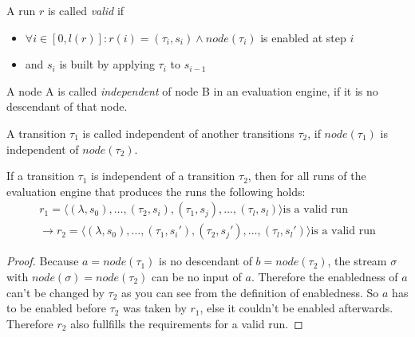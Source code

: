 \begin{definition}[name = Valid Run]\label{def:valid_run}
  A run \(r\) is called \emph{valid} if
  \begin{itemize}
    \item \(\forall i \in [0,l(r)]: r(i) = (\tau_i,s_i) \land \mathit{node}(\tau_i)\) is enabled at step \(i\)
    \item and \(s_i\) is built by applying \(\tau_i\) to \(s_{i-1}\)
  \end{itemize}
\end{definition}

\begin{definition}[name = Independence of Nodes]\label{def:node_independent}
  A node A is called \emph{independent} of node B in an evaluation engine, if it is no descendant of that node.
\end{definition}

\begin{definition}[name = Independence of Transitions]\label{def:independence_transitions}
  A transition \(\tau_1\) is called independent of another transitions \(\tau_2\), if \(\mathit{node}(\tau_1)\) is independent of \(\mathit{node}(\tau_2)\).
\end{definition}

\begin{lemma}[name = Exchange of Independent Transitions]\label{lemma:exchange_independent_transitions}
  If a transition \(\tau_1\) is independent of a transition \(\tau_2\), then for all runs of the evaluation engine that produces the runs the following holds:
  \begin{align*}
    r_1 = \langle (\lambda, s_0), \dots, (\tau_2, s_i), (\tau_1, s_j), \dots, (\tau_l, s_l) \rangle \text{is a valid run} \\
    \rightarrow r_2 = \langle (\lambda, s_0), \dots, (\tau_1, s_i'), (\tau_2, s_j'), \dots, (\tau_l, s_l') \rangle \text{is a valid run}
  \end{align*}
\end{lemma}

\begin{proof}
Because \(a = \mathit{node}(\tau_1)\) is no descendant of \(b = \mathit{node}(\tau_2)\), the stream \(\sigma\) with \(\mathit{node}(\sigma) = \mathit{node}(\tau_2)\) can be no input of \(a\).
  Therefore the enabledness of \(a\) can't be changed by \(\tau_2\) as you can see from the definition of enabledness.
  So \(a\) has to be enabled before \(\tau_2\) was taken by \(r_1\), else it couldn't be enabled afterwards.
  Therefore \(r_2\) also fullfills the requirements for a valid run.
\end{proof}

